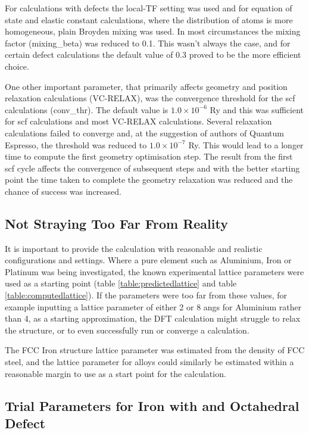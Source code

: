 For calculations with defects the local-TF setting was used and for equation of state and elastic constant calculations, where the distribution of atoms is more homogeneous, plain Broyden mixing was used.  In most circumstances the mixing factor (mixing\_beta) was reduced to 0.1.  This wasn't always the case, and for certain defect calculations the default value of 0.3 proved to be the more efficient choice.

One other important parameter, that primarily affects geometry and position relaxation calculations (VC-RELAX), was the convergence threshold for the \acrshort{scf} calculations (conv\_thr).  The default value is $1.0\times 10^{-6}$ Ry and this was sufficient for \acrshort{scf} calculations and most VC-RELAX calculations.  Several relaxation calculations failed to converge and, at the suggestion of authors of Quantum Espresso, the threshold was reduced to $1.0\times 10^{-7}$ Ry.  This would lead to a longer time to compute the first geometry optimisation step.  The result from the first \acrshort{scf} cycle affects the convergence of subsequent steps and with the better starting point the time taken to complete the geometry relaxation was reduced and the chance of success was increased.



\subsection{Not Straying Too Far From Reality}

It is important to provide the calculation with reasonable and realistic configurations and settings.  Where a pure element such as Aluminium, Iron or Platinum was being investigated, the known experimental lattice parameters were used as a starting point (table \ref{table:predictedlattice} and table \ref{table:computedlattice}).  If the parameters were too far from these values, for example inputting a lattice parameter of either 2 or 8 angs for Aluminium rather than 4, as a starting approximation, the DFT calculation might struggle to relax the structure, or to even successfully run or converge a calculation.

The FCC Iron structure lattice parameter was estimated from the density of FCC steel, and the lattice parameter for alloys could similarly be estimated within a reasonable margin to use as a start point for the calculation.



\subsection{Trial Parameters for Iron with and Octahedral Defect}

